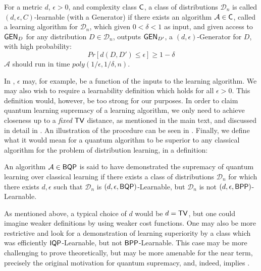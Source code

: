 \begin{definition}
    \label{def:weak_learnable_supp}
    For a metric $d$, $\epsilon > 0$, and complexity class $\operatorname{\textsf{C}}$, a class of distributions $\mathcal{D}_n$ is called $\left( d , \epsilon, C \right)$-learnable (with a Generator) if there exists an algorithm $\mathcal{A} \in \operatorname{\textsf{C}}$, called a learning algorithm for $\mathcal{D}_n$, which given $0 < \delta < 1$ as input, and given access to $\operatorname{\textsf{GEN}}_{D}$ for any distribution $D \in \mathcal{D}_n$, outputs $\operatorname{\textsf{GEN}}_{D'}$, a $\left( d , \epsilon \right)$-Generator for $D$, with high probability:
    \begin{equation}
        Pr \left[ d \left( D, D' \right) \leq \epsilon \right] \geq 1 - \delta
    \end{equation}
    $\mathcal{A}$ should run in time $poly(1/\epsilon, 1/\delta, n)$.
\end{definition}

In , $\epsilon$ may, for example, be a function of the inputs to the learning algorithm. We may also wish to require a learnability definition which holds for all $\epsilon > 0$. This definition would, however, be too strong for our purposes. In order to claim quantum learning supremacy of a learning algorithm, we only need to achieve closeness up to a \textit{fixed} $\operatorname{\textsf{TV}}$ distance, as mentioned in the main text, and discussed in detail in . An illustration of the procedure can be seen in . Finally, we define what it would mean for a quantum algorithm to be superior to any classical algorithm for the problem of distribution learning, in a definition:

\begin{definition}    
    \label{defn:superiority_supp}
    An algorithm $\mathcal{A} \in \textsf{BQP}$ is said to have demonstrated the supremacy of quantum learning over classical learning if there exists a class of distributions $\mathcal{D}_n$ for which there exists $d ,\epsilon$ such that $\mathcal{D}_n$ is $\left( d ,\epsilon, \textsf{BQP} \right)$-Learnable, but $\mathcal{D}_n$ is not $\left( d ,\epsilon, \textsf{BPP} \right)$-Learnable.
\end{definition}

As mentioned above, a typical choice of $d$ would be $d = \operatorname{\textsf{TV}}$, but one could imagine weaker definitions by using weaker cost functions. One may also be more restrictive and look for a demonstration of learning superiority by a class which was efficiently $\operatorname{\textsf{IQP}}$-Learnable, but not $\textsf{BPP}$-Learnable. This case may be more challenging to prove theoretically, but may be more amenable for the near term, precisely the original motivation for quantum supremacy, and, indeed, implies .
